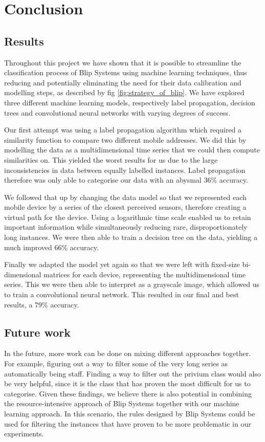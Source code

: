 \chapter{Conclusion}\label{chap:results}
\section{Results}
Throughout this project we have shown that it is possible to streamline the classification process of Blip Systems using machine learning techniques, thus reducing and potentially eliminating the need for their data calibration and modelling steps, as described by fig \ref{fig:strategy_of_blip}. We have explored three different machine learning models, respectively label propagation, decision trees and convolutional neural networks with varying degrees of success. 
\par
\medskip
Our first attempt was using a label propagation algorithm which required a similarity function to compare two different mobile addresses. We did this by modelling the data as a multidimensional time series that we could then compute similarities on. This yielded the worst results for us due to the large inconsistencies in data between equally labelled instances. Label propagation therefore was only able to categorise our data with an abysmal 36\% accuracy.
\par
\medskip
We followed that up by changing the data model so that we represented each mobile device by a series of the closest perceived sensors, therefore creating a virtual path for the device. Using a logarithmic time scale enabled us to retain important information while simultaneously reducing rare, disproportionately long instances. We were then able to train a decision tree on the data, yielding a much improved 66\% accuracy. 
\par
\medskip
Finally we adapted the model yet again so that we were left with fixed-size bi-dimensional matrices for each device, representing the multidimensional time series. This we were then able to interpret as a grayscale image, which allowed us to train a convolutional neural network. This resulted in our final and best results, a 79\% accuracy. 

\section{Future work}

In the future, more work can be done on mixing different approaches together. For example, figuring out a way to filter some of the very long series as automatically being staff. Finding a way to filter out the privium class would also be very helpful, since it is the class that has proven the most difficult for us to categorise. Given these findings, we believe there is also potential in combining the resource-intensive approach of Blip Systems together with our machine learning approach. In this scenario, the rules designed by Blip Systems could be used for filtering the instances that have proven to be more problematic in our experiments.
